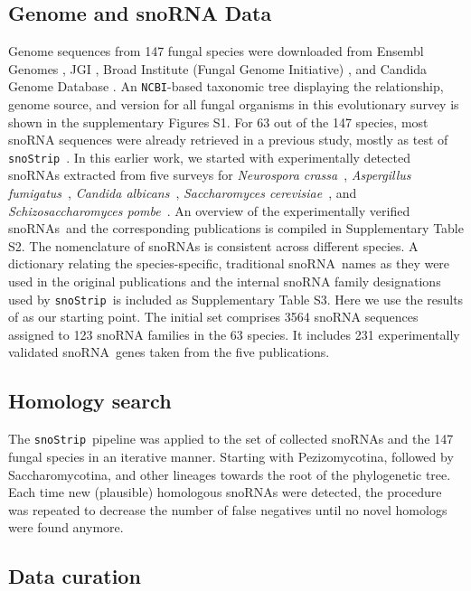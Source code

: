 \documentclass[preprint,3p,times,twocolumn]{elsarticle}
\newcommand{\snos}{snoRNAs}
\newcommand{\sno}{snoRNA}
\newcommand{\snostrip}{\texttt{snoStrip}}
\newcommand{\ncbi}{\texttt{NCBI}}
\newcommand{\Afu}{\emph{Aspergillus fumigatus}}
\newcommand{\Calb}{\emph{Candida albicans}}
\newcommand{\Spo}{\emph{Schizosaccharomyces pombe}}
\newcommand{\Ncr}{\emph{Neurospora crassa}}
\newcommand{\Sce}{\emph{Saccharomyces cerevisiae}}
\begin{document}
\subsection{Genome and snoRNA Data} 

Genome sequences from 147 fungal species were downloaded from Ensembl
Genomes \cite{Kersey:2016}, JGI \cite{Nordberg:2014}, Broad Institute
(Fungal Genome Initiative) , and Candida Genome Database
\cite{Skrzypek:2017}.  An \ncbi-based taxonomic tree displaying the
relationship, genome source, and version for all fungal organisms in
this evolutionary survey is shown in the supplementary Figures S1.
For 63 out of the 147 species, most snoRNA sequences were already
retrieved in a previous study, mostly as test of \snostrip\
\cite{Bartschat:2014}.  In this earlier work, we started with
experimentally detected snoRNAs extracted from five surveys for \Ncr\
\cite{Liu:2009}, \Afu\ \cite{Joechl:2008}, \Calb\
\cite{Mitrovich:2010}, \Sce\ \cite{Piekna-Przybylska:2007}, and \Spo\
\cite{Li:2005}. An overview of the experimentally verified \snos\ and
the corresponding publications is compiled in Supplementary Table
S2. The nomenclature of snoRNAs is consistent across different
species. A dictionary relating the species-specific, traditional \sno\
names as they were used in the original publications and the internal
snoRNA family designations used by \snostrip\ is included as
Supplementary Table S3.  Here we use the results of
\cite{Bartschat:2014} as our starting point.  The initial set comprises
3564 snoRNA sequences assigned to 123 snoRNA families in the 63
species. It includes 231 experimentally validated \sno\ genes taken
from the five publications.

\subsection{Homology search}

The \snostrip\ pipeline \cite{Bartschat:2014} was applied to the set
of collected snoRNAs and the 147 fungal species in an iterative
manner. Starting with Pezizomycotina, followed by Saccharomycotina,
and other lineages towards the root of the phylogenetic tree. Each
time new (plausible) homologous snoRNAs were detected, the procedure
was repeated to decrease the number of false negatives until no novel
homologs were found anymore.

\subsection{Data curation}
\end{document}

